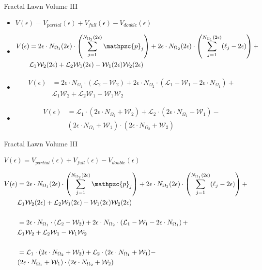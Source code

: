 \documentclass{if-beamer}
\newcommand{\SL}{\mathcal{L}}
\newcommand{\W}{\mathcal{W}}
\newcommand{\p}{\mathpzc{p}}
\newcommand{\Om}{\Omega}
\begin{document}
\begin{frame}{Fractal Lawn Volume III}

\begin{itemize}
	\item $V(\epsilon)=V_{partial}(\epsilon) + V_{full}(\epsilon) - V_{double}(\epsilon)$
	\pause 
	
	\item \begin{align*}
	V(\epsilon)&=2\epsilon \cdot N_{\Om_1}(2\epsilon) \cdot \left(\sum_{j=1}^{N_{\Om_2}(2\epsilon)} \p_j \right) + 2\epsilon \cdot N_{\Om_2}(2\epsilon) \cdot \left(\sum_{j=1}^{N_{\Om_1}(2\epsilon)} (\ell_j - 2\epsilon) \right) + \\
	 &\SL_1 \W_2(2\epsilon) + \SL_2 \W_1(2\epsilon) - \W_1(2\epsilon) \W_2(2\epsilon)
	\end{align*}
	\pause 
	
	\item \begin{align*}
	V(\epsilon) &= 2\epsilon \cdot N_{\Om_1} \cdot (\SL_2 - \W_2) + 2\epsilon \cdot N_{\Om_2} \cdot \left( \SL_1 - \W_1 - 2\epsilon \cdot N_{\Om_1} \right) + \\
	 &\SL_1 \W_2 + \SL_2 \W_1 - \W_1 \W_2
	\end{align*}
	\pause
	
	\item \begin{align*}
	V(\epsilon) &= \SL_1 \cdot (2\epsilon \cdot N_{\Om_2} + \W_2) + \SL_2 \cdot (2\epsilon \cdot N_{\Om_1} + \W_1) - \\
	&(2\epsilon \cdot N_{\Om_1} + \W_1) \cdot (2\epsilon \cdot N_{\Om_2} + \W_2)
	\end{align*}
\end{itemize}

\end{frame}

\begin{frame}{Fractal Lawn Volume III}

$V(\epsilon)=V_{partial}(\epsilon) + V_{full}(\epsilon) - V_{double}(\epsilon)$
\pause
	
	\begin{align*}
	V(\epsilon)&=2\epsilon \cdot N_{\Om_1}(2\epsilon) \cdot \left(\sum_{j=1}^{N_{\Om_2}(2\epsilon)} \p_j \right) + 2\epsilon \cdot N_{\Om_2}(2\epsilon) \cdot \left(\sum_{j=1}^{N_{\Om_1}(2\epsilon)} (\ell_j - 2\epsilon) \right) + \\
	 &\SL_1 \W_2(2\epsilon) + \SL_2 \W_1(2\epsilon) - \W_1(2\epsilon) \W_2(2\epsilon) \\ \\
	&= 2\epsilon \cdot N_{\Om_1} \cdot (\SL_2 - \W_2) + 2\epsilon \cdot N_{\Om_2} \cdot \left( \SL_1 - \W_1 - 2\epsilon \cdot N_{\Om_1} \right) + \\
	 &\SL_1 \W_2 + \SL_2 \W_1 - \W_1 \W_2 \\ \\
	&= \SL_1 \cdot (2\epsilon \cdot N_{\Om_2} + \W_2) + \SL_2 \cdot (2\epsilon \cdot N_{\Om_1} + \W_1) - \\
	&(2\epsilon \cdot N_{\Om_1} + \W_1) \cdot (2\epsilon \cdot N_{\Om_2} + \W_2)
	\end{align*}
\end{frame}
\end{document}

